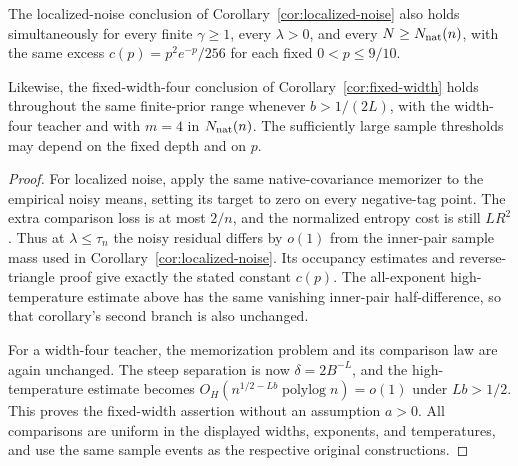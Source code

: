 \begin{corollary}
\label{cor:relu-native-variants}
The localized-noise conclusion of Corollary~\ref{cor:localized-noise}
also holds simultaneously for every finite $\gamma\geq1$, every
$\lambda>0$, and every $N\geq N_{\rm nat}(n)$, with the same excess
$c(p)=p^2e^{-p}/256$ for each fixed $0<p\leq9/10$.

Likewise, the fixed-width-four conclusion of
Corollary~\ref{cor:fixed-width} holds throughout the same finite-prior
range whenever $b>1/(2L)$, with the width-four teacher and with $m=4$
in $N_{\rm nat}(n)$.  The sufficiently large sample thresholds may
depend on the fixed depth and on $p$.
\end{corollary}
\begin{proof}
For localized noise, apply the same native-covariance memorizer to the
empirical noisy means, setting its target to zero on every negative-tag
point.  The extra comparison loss is at most $2/n$, and the normalized
entropy cost is still $LR^2$.  Thus at $\lambda\leq\tau_n$ the noisy
residual differs by $o(1)$ from the inner-pair sample mass used in
Corollary~\ref{cor:localized-noise}.  Its occupancy estimates and
reverse-triangle proof give exactly the stated constant $c(p)$.
The all-exponent high-temperature estimate above has the same vanishing
inner-pair half-difference, so that corollary's second branch is also
unchanged.

For a width-four teacher, the memorization problem and its comparison
law are again unchanged.  The steep separation is now
$\delta=2B^{-L}$, and the high-temperature estimate becomes
$O_H(n^{1/2-Lb}\operatorname{polylog}n)=o(1)$ under $Lb>1/2$.
This proves the fixed-width assertion without an assumption $a>0$.
All comparisons are uniform in the displayed widths, exponents, and
temperatures, and use the same sample events as the respective original
constructions.
\end{proof}
